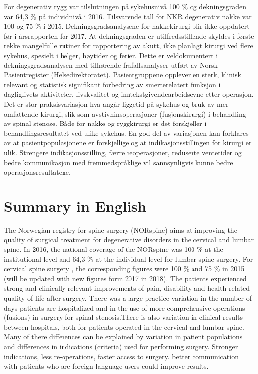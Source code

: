 \documentclass[norsk, a4paper, twocolumn]{report}
\begin{document}
For degenerativ rygg var tilslutningen på sykehusnivå 100 \% og dekningsgraden var 64,3 \% på individnivå i
2016. Tilsvarende tall for NKR degenerativ nakke var 100 og 75 \% i 2015. Dekningsgradsanalysene for nakkekirurgi blir ikke oppdatert før i årsrapporten for 2017. At
dekningsgraden er utilfredsstillende skyldes i første rekke mangelfulle rutiner for
rapportering av akutt, ikke planlagt kirurgi ved flere sykehus, spesielt i helger,
høytider og ferier. Dette er veldokumentert i dekningsgradsanalysen med tilhørende frafallsanalyser utført av Norsk Pasientregister (Helsedirektoratet).
Pasientgruppene opplever en sterk, klinisk relevant og statistisk signifikant
forbedring av smerterelatert funksjon i dagliglivets aktiviteter, livskvalitet og
inntekstgivendearbeidsevne etter operasjon.
 Det er stor praksisvariasjon hva angår liggetid på sykehus og bruk av mer omfattende kirurgi, slik som avstivninsoperasjoner (fusjonskirurgi) i behandling av spinal stenose. Både for nakke og ryggkirurgi er det forskjeller i behandlingsresultatet ved ulike sykehus. En
god del av variasjonen kan forklares av at pasientpopulasjonene er forskjellige og at
indikasjonsstillingen for kirurgi er ulik. Strengere indikasjonsstilling, færre reoperasjoner, reduserte
ventetider og bedre kommunikasjon med fremmedspråklige vil sannsynligvis kunne
bedre operasjonsresultatene.

\section*{Summary in English}

The Norwegian registry for spine surgery (NORspine) aims at improving the quality of surgical treatment for degenerative disorders in the cervical and lumbar spine. 
In 2016, the  national coverage of the NORspine was 100 \% at the institutional level and 64,3 \% at the individual level for lumbar spine surgery. For cervical spine surgery , the corresponding figures were 100 \%  and 75 \% in 2015 (will be updated with new figures form 2017 in 2018). The patients experienced strong and clinically relevant improvements of pain, disability and health-related quality of life after surgery. There was a large practice variation in the number of days patients are hospitalized and in the use of more comprehensive operations (fusions) in surgery for spinal stenosis.There is also variation in clinical results between hospitals, both for patients operated in the cervical and lumbar spine. Many of there differences can be explained by variation in patient populations and differences in indications (criteria) used for performing surgery. Stronger indications, less re-operations, faster access to surgery. better communication with patients who are foreign language users could improve results.
\end{document}
